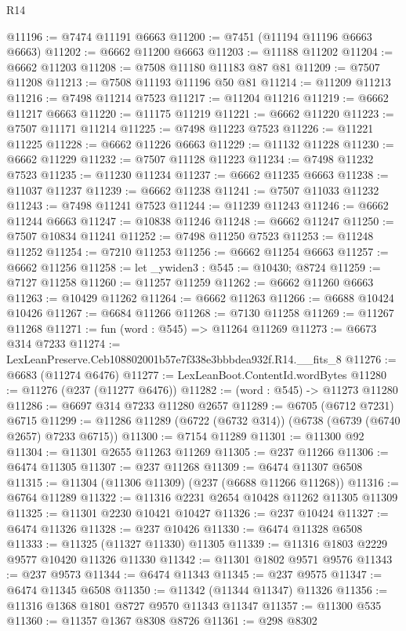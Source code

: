 \begin{lexlean}{R14}
\begin{coremodule}
@11196 := @7474 @11191 @6663
@11200 := @7451 (@11194 @11196 @6663 @6663)
@11202 := @6662 @11200 @6663
@11203 := @11188 @11202
@11204 := @6662 @11203
@11208 := @7508 @11180 @11183 @87 @81
@11209 := @7507 @11208
@11213 := @7508 @11193 @11196 @50 @81
@11214 := @11209 @11213
@11216 := @7498 @11214 @7523
@11217 := @11204 @11216
@11219 := @6662 @11217 @6663
@11220 := @11175 @11219
@11221 := @6662 @11220
@11223 := @7507 @11171 @11214
@11225 := @7498 @11223 @7523
@11226 := @11221 @11225
@11228 := @6662 @11226 @6663
@11229 := @11132 @11228
@11230 := @6662 @11229
@11232 := @7507 @11128 @11223
@11234 := @7498 @11232 @7523
@11235 := @11230 @11234
@11237 := @6662 @11235 @6663
@11238 := @11037 @11237
@11239 := @6662 @11238
@11241 := @7507 @11033 @11232
@11243 := @7498 @11241 @7523
@11244 := @11239 @11243
@11246 := @6662 @11244 @6663
@11247 := @10838 @11246
@11248 := @6662 @11247
@11250 := @7507 @10834 @11241
@11252 := @7498 @11250 @7523
@11253 := @11248 @11252
@11254 := @7210 @11253
@11256 := @6662 @11254 @6663
@11257 := @6662 @11256
@11258 := let _ywiden3 : @545 := @10430; @8724
@11259 := @7127 @11258
@11260 := @11257 @11259
@11262 := @6662 @11260 @6663
@11263 := @10429 @11262
@11264 := @6662 @11263
@11266 := @6688 @10424 @10426
@11267 := @6684 @11266
@11268 := @7130 @11258
@11269 := @11267 @11268
@11271 := fun (word : @545) => @11264 @11269
@11273 := @6673 @314 @7233
@11274 := LexLeanPreserve.Ceb108802001b57e7f338e3bbbdea932f.R14.__fits_8
@11276 := @6683 (@11274 @6476)
@11277 := LexLeanBoot.ContentId.wordBytes
@11280 := @11276 (@237 (@11277 @6476))
@11282 := (word : @545) -> @11273 @11280
@11286 := @6697 @314 @7233 @11280 @2657
@11289 := @6705 (@6712 @7231) @6715
@11299 := @11286 @11289 (@6722 (@6732 @314)) (@6738 (@6739 (@6740 @2657) @7233 @6715))
@11300 := @7154 @11289
@11301 := @11300 @92
@11304 := @11301 @2655 @11263 @11269
@11305 := @237 @11266
@11306 := @6474 @11305
@11307 := @237 @11268
@11309 := @6474 @11307 @6508
@11315 := @11304 (@11306 @11309) (@237 (@6688 @11266 @11268))
@11316 := @6764 @11289
@11322 := @11316 @2231 @2654 @10428 @11262 @11305 @11309
@11325 := @11301 @2230 @10421 @10427
@11326 := @237 @10424
@11327 := @6474 @11326
@11328 := @237 @10426
@11330 := @6474 @11328 @6508
@11333 := @11325 (@11327 @11330) @11305
@11339 := @11316 @1803 @2229 @9577 @10420 @11326 @11330
@11342 := @11301 @1802 @9571 @9576
@11343 := @237 @9573
@11344 := @6474 @11343
@11345 := @237 @9575
@11347 := @6474 @11345 @6508
@11350 := @11342 (@11344 @11347) @11326
@11356 := @11316 @1368 @1801 @8727 @9570 @11343 @11347
@11357 := @11300 @535
@11360 := @11357 @1367 @8308 @8726
@11361 := @298 @8302

\end{coremodule}
\end{lexlean}
